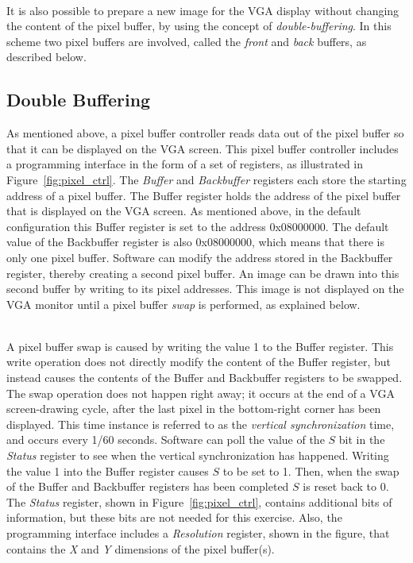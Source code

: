 \documentclass[epsfig,10pt,fullpage]{article}
\begin{document}
~\\
It is also possible to prepare a new image for the VGA display without changing the content 
of the pixel buffer, by using the concept of {\it double-buffering}.  In this scheme two 
pixel buffers are involved, called the {\it front} and {\it back} buffers, as described below.

\subsection*{Double Buffering}
\label{sec:double_buffer}
As mentioned above, a pixel buffer controller reads data out of the pixel buffer so that it 
can be displayed on the VGA screen. This pixel buffer controller 
includes a programming interface in the form of a set of registers, as
illustrated in Figure~\ref{fig:pixel_ctrl}.
The {\it Buffer} and {\it Backbuffer} registers each store the starting address of a pixel buffer.
The Buffer register holds the address of the pixel buffer that is displayed on the VGA screen.
As mentioned above, in the default configuration this Buffer register is set to the address {\sf 0x08000000}.
The default value of the Backbuffer register is also {\sf 0x08000000}, which means that there is only one pixel buffer.
Software can modify the address stored in the Backbuffer register, thereby creating a second pixel buffer.
An image can be drawn into this second buffer by writing to its pixel addresses.
This image is not displayed on the VGA monitor until a pixel buffer {\it swap} is performed, as explained below.

~\\
A pixel buffer swap is caused by writing the value 1 to the Buffer register. This write
operation does not directly modify the content of the Buffer register, but instead causes
the contents of the Buffer and Backbuffer registers to be swapped. The swap operation does
not happen right away; it occurs at the end of a VGA screen-drawing cycle, after the last 
pixel in the bottom-right corner has been displayed. This time instance is referred to as
the {\it vertical synchronization} time, and occurs every 1/60 seconds. Software can poll the
value of the $S$ bit in the {\it Status} register to see when the vertical synchronization has happened.
Writing the value 1 into the Buffer register causes $S$ to be set to 1. Then, when the swap of
the Buffer and Backbuffer registers has been completed $S$ is reset back to 0. The {\it Status}
register, shown in Figure~\ref{fig:pixel_ctrl}, contains additional bits of information,
but these bits are not needed for this exercise.  Also, the programming interface includes
a {\it Resolution} register, shown in the figure, that contains the {\it X} and {\it Y}
dimensions of the pixel buffer(s).  
\end{document}
